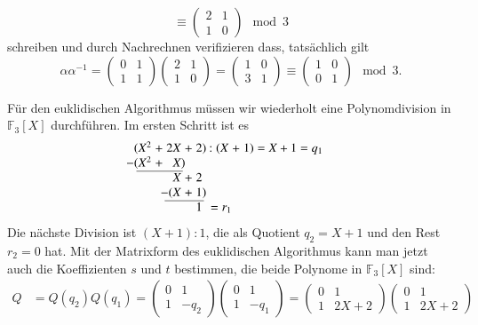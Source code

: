 \begin{loesung}
\begin{teilaufgaben}
\[\equiv
\begin{pmatrix}2&1\\1&0\end{pmatrix}
\mod 3
\]
schreiben und durch Nachrechnen verifizieren dass, tatsächlich gilt
\[
\alpha\alpha^{-1}
=
\begin{pmatrix}
0&1\\
1&1
\end{pmatrix}
\begin{pmatrix}
2&1\\
1&0
\end{pmatrix}
=
\begin{pmatrix}
1&0\\
3&1
\end{pmatrix}
\equiv
\begin{pmatrix}
1&0\\
0&1
\end{pmatrix}
\mod 3.
\]
\item
Für den euklidischen Algorithmus müssen wir wiederholt eine Polynomdivision
in $\mathbb{F}_3[X]$ durchführen.
Im ersten Schritt ist es
\[
\arraycolsep=1.4pt
\begin{array}{rcrcrcrcrcr}
  \llap{$($}X^2&+&2X&+&2\rlap{$)$}&\;:&(X&+&1)&=&X + 1 = q_1\\
 \llap{$-($}X^2&+&X\rlap{$)$}& &  & &  & &  & & \\ \cline{1-3}
     & &X&+&2 & & &  & &  & \\
 & & \llap{$-($}X&+&1\rlap{$)$} & &  & &  & & \\ \cline{3-5}
 & & & &1 &\rlap{$\mathstrut = r_1$}\phantom{)}& &  & & &\\
\end{array}
\]
Die nächste Division ist $(X+1) : 1$, die als Quotient $q_2=X+1$ und den
Rest $r_2=0$ hat.
Mit der Matrixform des euklidischen Algorithmus kann man jetzt auch die
Koeffizienten $s$ und $t$ bestimmen, die beide Polynome in $\mathbb{F}_3[X]$
sind:
\begin{align*}
Q
&=
Q(q_2)
Q(q_1)
=
\begin{pmatrix}
0&1\\1&-q_2
\end{pmatrix}
\begin{pmatrix}
0&1\\1&-q_1
\end{pmatrix}
=
\begin{pmatrix}
0&1\\1&2X+2
\end{pmatrix}
\begin{pmatrix}
0&1\\1&2X+2

\end{pmatrix}
\end{align*}
\end{teilaufgaben}
\end{loesung}
